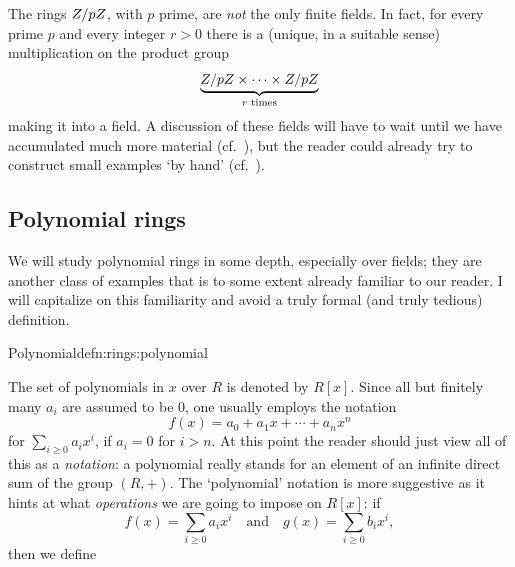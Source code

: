 \begin{exam}{}{}
  The rings $Z/pZ$, with $p$ prime, are \emph{not} the only finite
  fields. In fact, for every prime $p$ and every integer $r > 0$ there
  is a (unique, in a suitable sense) multiplication on the product
  group
  \[
    \underbrace{Z/pZ \times \cdots \times Z/pZ}_{r \text{ times}}
  \]
  making it into a field. A discussion of these fields will have to
  wait until we have accumulated much more material (cf.\
  ), but the reader could already
  try to construct small examples `by hand' (cf.\
  ).
\end{exam}

\subsection{Polynomial rings}
\label{subsec:rings:polynomial-rings}
We will study polynomial rings in some depth, especially over fields;
they are another class of examples that is to some extent already
familiar to our reader. I will capitalize on this familiarity and
avoid a truly formal (and truly tedious) definition.
\begin{defn}{Polynomial}{defn:rings:polynomial}
\end{defn}
The set of polynomials in $x$ over $R$ is denoted by $R[x]$. Since all
but finitely many $a_i$ are assumed to be $0$, one usually employs the
notation
\[
  f(x) = a_0 + a_1 x + \cdots + a_n x^n
\]
for $\sum_{i \geq 0} a_i x^i$, if $a_i = 0$ for $i > n$.  At this
point the reader should just view all of this as a \emph{notation}: a
polynomial really stands for an element of an infinite direct sum of
the group $(R, +)$. The `polynomial' notation is more suggestive as it
hints at what \emph{operations} we are going to impose on $R[x]$: if
\[
  f(x) = \sum_{i \geq 0} a_i x^i \quad \text{and} \quad g(x) = \sum_{i
    \geq 0} b_i x^i,
\]
then we define
